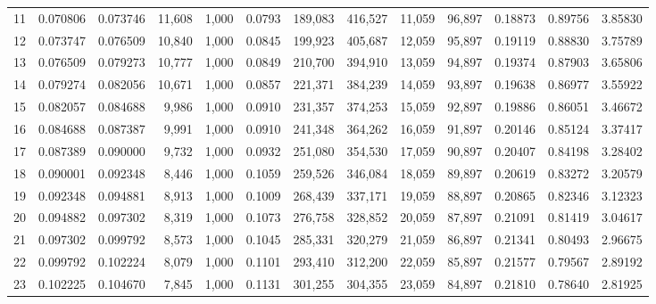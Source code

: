 \begin{tabular}{rrrrrrrrrrrrr}
11  &  0.070806 &  0.073746 &  11,608 &  1,000 &                                     0.0793 &  189,083 &  416,527 &   11,059 &   96,897 &  0.18873 &  0.89756 &  3.85830 \\
12  &  0.073747 &  0.076509 &  10,840 &  1,000 &                                     0.0845 &  199,923 &  405,687 &   12,059 &   95,897 &  0.19119 &  0.88830 &  3.75789 \\
13  &  0.076509 &  0.079273 &  10,777 &  1,000 &                                     0.0849 &  210,700 &  394,910 &   13,059 &   94,897 &  0.19374 &  0.87903 &  3.65806 \\
14  &  0.079274 &  0.082056 &  10,671 &  1,000 &                                     0.0857 &  221,371 &  384,239 &   14,059 &   93,897 &  0.19638 &  0.86977 &  3.55922 \\
15  &  0.082057 &  0.084688 &   9,986 &  1,000 &                                     0.0910 &  231,357 &  374,253 &   15,059 &   92,897 &  0.19886 &  0.86051 &  3.46672 \\
16  &  0.084688 &  0.087387 &   9,991 &  1,000 &                                     0.0910 &  241,348 &  364,262 &   16,059 &   91,897 &  0.20146 &  0.85124 &  3.37417 \\
17  &  0.087389 &  0.090000 &   9,732 &  1,000 &                                     0.0932 &  251,080 &  354,530 &   17,059 &   90,897 &  0.20407 &  0.84198 &  3.28402 \\
18  &  0.090001 &  0.092348 &   8,446 &  1,000 &                                     0.1059 &  259,526 &  346,084 &   18,059 &   89,897 &  0.20619 &  0.83272 &  3.20579 \\
19  &  0.092348 &  0.094881 &   8,913 &  1,000 &                                     0.1009 &  268,439 &  337,171 &   19,059 &   88,897 &  0.20865 &  0.82346 &  3.12323 \\
20  &  0.094882 &  0.097302 &   8,319 &  1,000 &                                     0.1073 &  276,758 &  328,852 &   20,059 &   87,897 &  0.21091 &  0.81419 &  3.04617 \\
21  &  0.097302 &  0.099792 &   8,573 &  1,000 &                                     0.1045 &  285,331 &  320,279 &   21,059 &   86,897 &  0.21341 &  0.80493 &  2.96675 \\
22  &  0.099792 &  0.102224 &   8,079 &  1,000 &                                     0.1101 &  293,410 &  312,200 &   22,059 &   85,897 &  0.21577 &  0.79567 &  2.89192 \\
23  &  0.102225 &  0.104670 &   7,845 &  1,000 &                                     0.1131 &  301,255 &  304,355 &   23,059 &   84,897 &  0.21810 &  0.78640 &  2.81925 \\

\end{tabular}
